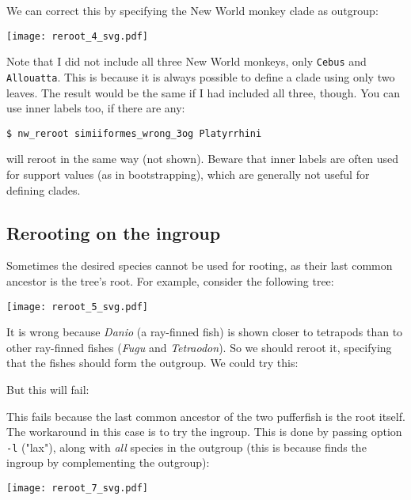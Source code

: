 \noindent{}We can correct this by specifying the New World monkey clade as outgroup:



\begin{center}
\texttt{[image: reroot\_4\_svg.pdf]}
\end{center}

\noindent{}Note that I did not include all three New World monkeys, only \texttt{Cebus} and \texttt{Allouatta}. This is because it is always possible to define a clade using only two leaves. The result would be the same if I had included all three, though. You can use inner labels too, if there are any:
\begin{verbatim}
$ nw_reroot simiiformes_wrong_3og Platyrrhini
\end{verbatim}
will reroot in the same way (not shown). Beware that inner labels are often
used for support values (as in bootstrapping), which are generally not useful
for defining clades.

\subsection{Rerooting on the ingroup}

Sometimes the desired species cannot be used for rooting, as their last common ancestor is the tree's root. For example, consider the following tree:

\begin{center}
\texttt{[image: reroot\_5\_svg.pdf]}
\end{center}

\noindent{}It is wrong because \textit{Danio} (a ray-finned fish) is shown
closer to tetrapods than to other ray-finned fishes (\textit{Fugu} and
\textit{Tetraodon}). So we should reroot it, specifying that the fishes should
form the outgroup. We could try this:



\noindent{}But this will fail:



\noindent{}This fails because the last common ancestor of the two pufferfish is
the root itself. The workaround in this case is to try the ingroup. This is
done by passing option \texttt{-l} ("lax"), along with \emph{all} species in
the outgroup (this is because \reroot{} finds the ingroup by complementing the
outgroup):


\begin{center}
\texttt{[image: reroot\_7\_svg.pdf]}
\end{center}

